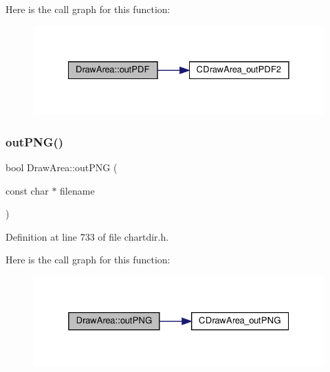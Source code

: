 Here is the call graph for this function\+:
\nopagebreak
\begin{figure}[H]
\begin{center}
\leavevmode
\includegraphics[width=328pt]{class_draw_area_aaf81710b0451baee666aed21f562d693_cgraph}
\end{center}
\end{figure}
\mbox{\label{class_draw_area_a710a45aff2cda879fb743677ea81c98f}} 
\subsubsection{\texorpdfstring{out\+P\+N\+G()}{outPNG()}\hspace{0.1cm}{\footnotesize\ttfamily [1/3]}}
{\footnotesize\ttfamily bool Draw\+Area\+::out\+P\+NG (\begin{DoxyParamCaption}\item[{const char $\ast$}]{filename }\end{DoxyParamCaption})\hspace{0.3cm}{\ttfamily [inline]}}



Definition at line 733 of file chartdir.\+h.

Here is the call graph for this function\+:
\nopagebreak
\begin{figure}[H]
\begin{center}
\leavevmode
\includegraphics[width=325pt]{class_draw_area_a710a45aff2cda879fb743677ea81c98f_cgraph}
\end{center}
\end{figure}
\mbox{\label{class_draw_area_a321d5bfa06ce6c67109cbd59ba656215}} 
